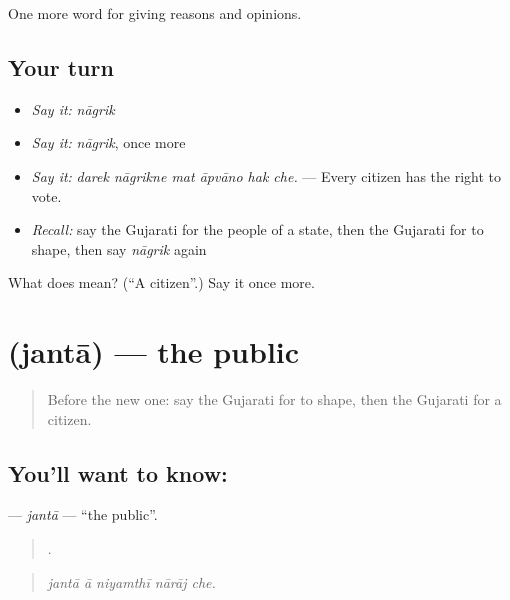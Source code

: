 \begin{grammarlens}[title={What you've built}]
One more word for giving reasons and opinions.
\end{grammarlens}

\subsection*{Your turn}
\begin{itemize}
\raggedright
  \item \emph{Say it:} \emph{nāgrik}
  \item \emph{Say it:} \emph{nāgrik}, once more
  \item \emph{Say it:} \emph{darek nāgrikne mat āpvāno hak che.} — Every citizen has the right to vote.
  \item \emph{Recall:} say the Gujarati for the people of a state, then the Gujarati for to shape, then say \emph{nāgrik} again
\end{itemize}

\begin{tcolorbox}[breakable,colback=teal!4,colframe=teal!35!black,title={Before you move on}]
What does  mean? (\textquotedblleft{}A citizen\textquotedblright{}.) Say it once more.
\end{tcolorbox}
\section[\texorpdfstring{\gu{જનતા} (jantā)}{જનતા (jantā)}]{ (jantā) — the public}

\label{lesson:GU-C353-janta}



\begin{quote}
Before the new one: say the Gujarati for to shape, then the Gujarati for a citizen.
\end{quote}

\subsection*{You'll want to know: }
\textbf{} — \emph{jantā} — \textquotedblleft{}the public\textquotedblright{}.

\begin{quote}
    .
\end{quote}

\begin{quote}
\emph{jantā ā niyamthī nārāj che.}
\end{quote}

